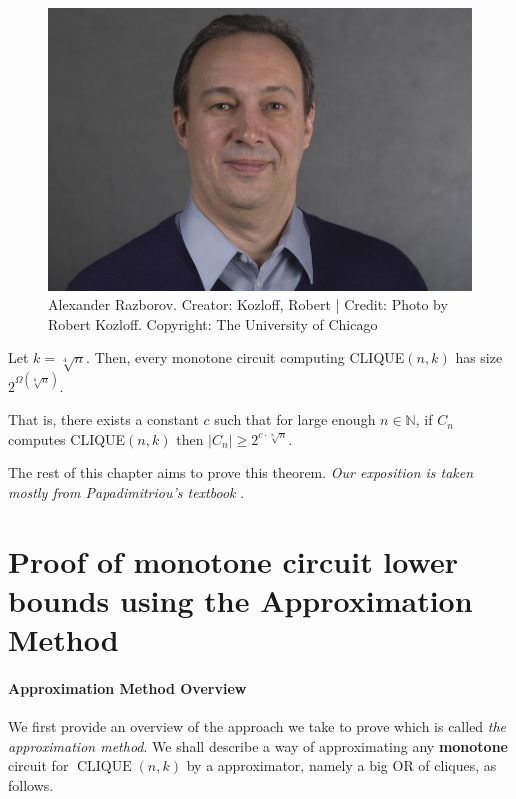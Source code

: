 \begin{figure}
    \centering
    \includegraphics[width=0.3\linewidth]{images/RAZBOROV_Alexander.jpeg}
    \caption{Alexander Razborov. Creator: Kozloff, Robert | Credit: Photo by Robert Kozloff.
Copyright: The University of Chicago}
    \label{fig:enter-label}
\end{figure}


\begin{tcolorbox}[colframe=white, colback=blue!5, boxrule=0mm, sharp corners]
\begin{theorem}\label{thm:razborov} Let $k=\sqrt[4]{n}$. Then, every monotone circuit computing {\rm CLIQUE}$(n, k)$ has size $2^{\Omega(\sqrt[8]{n})}$.
\end{theorem}
\end{tcolorbox}
That is, there exists a constant $c$ such that  for large enough $n \in \mathbb{N}$, if $C_n$ computes CLIQUE$(n,k)$ then $\left|C_n\right| \geq 2^{c \cdot \sqrt[8]{n}}$.


The rest of this chapter aims to prove this theorem. \textit{Our exposition is taken mostly from Papadimitriou's textbook} \cite{Pap94}.






\section{Proof of monotone circuit lower bounds  using the Approximation Method}


\paragraph{Approximation Method Overview}

We first provide an overview of the approach we take to prove  which is called \emph{the approximation method}. 
We shall describe a way of approximating any \textbf{monotone} circuit for $\operatorname{CLIQUE}({n}, {k})$ by a approximator, namely a big OR of cliques, as follows.
 

